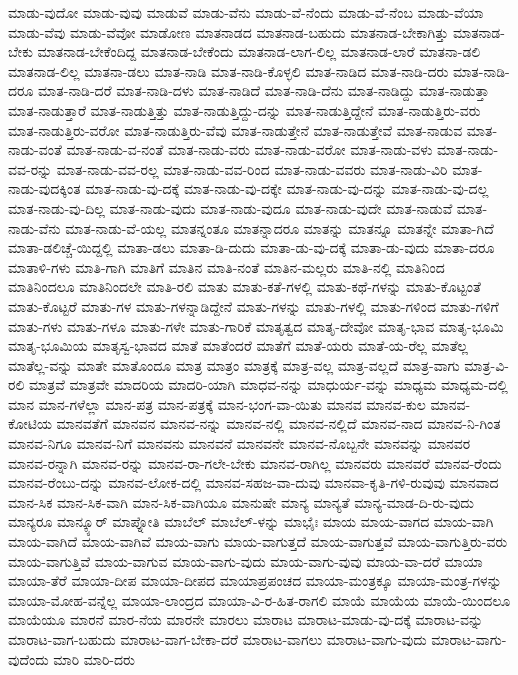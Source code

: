 {ಮಾಡು-ವುದೋ
ಮಾಡು-ವುವು
ಮಾಡುವೆ
ಮಾಡು-ವೆನು
ಮಾಡು-ವೆ-ನೆಂದು
ಮಾಡು-ವೆ-ನೆಂಬ
ಮಾಡು-ವೆಯಾ
ಮಾಡು-ವೆವು
ಮಾಡು-ವೆವೋ
ಮಾಡೋಣ
ಮಾತನಾಡದ
ಮಾತನಾಡ-ಬಹುದು
ಮಾತನಾಡ-ಬೇಕಾಗಿತ್ತು
ಮಾತನಾಡ-ಬೇಕು
ಮಾತನಾಡ-ಬೇಕೆಂದಿದ್ದ
ಮಾತನಾಡ-ಬೇಕೆಂದು
ಮಾತನಾಡ-ಲಾಗ-ಲಿಲ್ಲ
ಮಾತನಾಡ-ಲಾರೆ
ಮಾತನಾ-ಡಲಿ
ಮಾತನಾಡ-ಲಿಲ್ಲ
ಮಾತನಾ-ಡಲು
ಮಾತ-ನಾಡಿ
ಮಾತ-ನಾಡಿ-ಕೊಳ್ಳಲಿ
ಮಾತ-ನಾಡಿದ
ಮಾತ-ನಾಡಿ-ದರು
ಮಾತ-ನಾಡಿ-ದರೂ
ಮಾತ-ನಾಡಿ-ದರೆ
ಮಾತ-ನಾಡಿ-ದಳು
ಮಾತ-ನಾಡಿದೆ
ಮಾತ-ನಾಡಿ-ದೆನು
ಮಾತ-ನಾಡಿದ್ದು
ಮಾತ-ನಾಡುತ್ತಾ
ಮಾತ-ನಾಡುತ್ತಾರೆ
ಮಾತ-ನಾಡುತ್ತಿತ್ತು
ಮಾತ-ನಾಡುತ್ತಿದ್ದು-ದನ್ನು
ಮಾತ-ನಾಡುತ್ತಿದ್ದೇನೆ
ಮಾತ-ನಾಡುತ್ತಿರು-ವರು
ಮಾತ-ನಾಡುತ್ತಿರು-ವರೋ
ಮಾತ-ನಾಡುತ್ತಿರು-ವೆವು
ಮಾತ-ನಾಡುತ್ತೇನೆ
ಮಾತ-ನಾಡುತ್ತೇವೆ
ಮಾತ-ನಾಡುವ
ಮಾತ-ನಾಡು-ವಂತೆ
ಮಾತ-ನಾಡು-ವ-ನಂತೆ
ಮಾತ-ನಾಡು-ವರು
ಮಾತ-ನಾಡು-ವರೋ
ಮಾತ-ನಾಡು-ವಳು
ಮಾತ-ನಾಡು-ವವ-ರನ್ನು
ಮಾತ-ನಾಡು-ವವ-ರಲ್ಲ
ಮಾತ-ನಾಡು-ವವ-ರಿಂದ
ಮಾತ-ನಾಡು-ವವರು
ಮಾತ-ನಾಡು-ವಿರಿ
ಮಾತ-ನಾಡು-ವುದಕ್ಕಿಂತ
ಮಾತ-ನಾಡು-ವು-ದಕ್ಕೆ
ಮಾತ-ನಾಡು-ವು-ದಕ್ಕೇ
ಮಾತ-ನಾಡು-ವು-ದನ್ನು
ಮಾತ-ನಾಡು-ವು-ದಲ್ಲ
ಮಾತ-ನಾಡು-ವು-ದಿಲ್ಲ
ಮಾತ-ನಾಡು-ವುದು
ಮಾತ-ನಾಡು-ವುದೂ
ಮಾತ-ನಾಡು-ವುದೇ
ಮಾತ-ನಾಡುವೆ
ಮಾತ-ನಾಡು-ವೆನು
ಮಾತ-ನಾಡು-ವೆ-ಯಲ್ಲ
ಮಾತನ್ನಂತೂ
ಮಾತನ್ನಾದರೂ
ಮಾತನ್ನು
ಮಾತನ್ನೂ
ಮಾತನ್ನೇ
ಮಾತಾ-ಗಿದೆ
ಮಾತಾ-ಡಲಿಚ್ಚೆ-ಯಿದ್ದಲ್ಲಿ
ಮಾತಾ-ಡಲು
ಮಾತಾ-ಡಿ-ದುದು
ಮಾತಾ-ಡು-ವು-ದಕ್ಕೆ
ಮಾತಾ-ಡು-ವುದು
ಮಾತಾ-ದರೂ
ಮಾತಾಳಿ-ಗಳು
ಮಾತಿ-ಗಾಗಿ
ಮಾತಿಗೆ
ಮಾತಿನ
ಮಾತಿ-ನಂತೆ
ಮಾತಿನ-ಮಲ್ಲರು
ಮಾತಿ-ನಲ್ಲಿ
ಮಾತಿನಿಂದ
ಮಾತಿನಿಂದಲೂ
ಮಾತಿನಿಂದಲೇ
ಮಾತಿ-ರಲಿ
ಮಾತು
ಮಾತು-ಕತೆ-ಗಳಲ್ಲಿ
ಮಾತು-ಕಥೆ-ಗಳನ್ನು
ಮಾತು-ಕೊಟ್ಟಂತೆ
ಮಾತು-ಕೊಟ್ಟರೆ
ಮಾತು-ಗಳ
ಮಾತು-ಗಳನ್ನಾಡಿದ್ದೇನೆ
ಮಾತು-ಗಳನ್ನು
ಮಾತು-ಗಳಲ್ಲಿ
ಮಾತು-ಗಳಿಂದ
ಮಾತು-ಗಳಿಗೆ
ಮಾತು-ಗಳು
ಮಾತು-ಗಳೂ
ಮಾತು-ಗಳೇ
ಮಾತು-ಗಾರಿಕೆ
ಮಾತೃತ್ವದ
ಮಾತೃ-ದೇವೋ
ಮಾತೃ-ಭಾವ
ಮಾತೃ-ಭೂಮಿ
ಮಾತೃ-ಭೂಮಿಯ
ಮಾತೃಸ್ವ-ಭಾವದ
ಮಾತೆ
ಮಾತೆಂದರೆ
ಮಾತೆಗೆ
ಮಾತೆ-ಯರು
ಮಾತೆ-ಯ-ರೆಲ್ಲ
ಮಾತೆಲ್ಲ
ಮಾತೆಲ್ಲ-ವನ್ನು
ಮಾತೇ
ಮಾತೊಂದೂ
ಮಾತ್ರ
ಮಾತ್ರಂ
ಮಾತ್ರಕ್ಕೆ
ಮಾತ್ರ-ವಲ್ಲ
ಮಾತ್ರ-ವಲ್ಲದೆ
ಮಾತ್ರ-ವಾಗು
ಮಾತ್ರ-ವಿ-ರಲಿ
ಮಾತ್ರವೆ
ಮಾತ್ರವೇ
ಮಾದರಿಯ
ಮಾದರಿ-ಯಾಗಿ
ಮಾಧವ-ನನ್ನು
ಮಾಧುರ್ಯ-ವನ್ನು
ಮಾಧ್ಯಮ
ಮಾಧ್ಯಮ-ದಲ್ಲಿ
ಮಾನ
ಮಾನ-ಗಳೆಲ್ಲಾ
ಮಾನ-ಪತ್ರ
ಮಾನ-ಪತ್ರಕ್ಕೆ
ಮಾನ-ಭಂಗ-ವಾ-ಯಿತು
ಮಾನವ
ಮಾನವ-ಕುಲ
ಮಾನವ-ಕೋಟಿಯ
ಮಾನವತೆಗೆ
ಮಾನವನ
ಮಾನವ-ನನ್ನು
ಮಾನವ-ನಲ್ಲಿ
ಮಾನವ-ನಲ್ಲಿದೆ
ಮಾನವ-ನಾದ
ಮಾನವ-ನಿ-ಗಿಂತ
ಮಾನವ-ನಿಗೂ
ಮಾನವ-ನಿಗೆ
ಮಾನವನು
ಮಾನವನೆ
ಮಾನವನೇ
ಮಾನವ-ನೊಬ್ಬನೇ
ಮಾನವನ್ನು
ಮಾನವರ
ಮಾನವ-ರನ್ನಾಗಿ
ಮಾನವ-ರನ್ನು
ಮಾನವ-ರಾ-ಗಲೇ-ಬೇಕು
ಮಾನವ-ರಾಗಿಲ್ಲ
ಮಾನವರು
ಮಾನವರೆ
ಮಾನವ-ರೆಂದು
ಮಾನವ-ರೆಂಬು-ದನ್ನು
ಮಾನವ-ಲೋಕ-ದಲ್ಲಿ
ಮಾನವ-ಸಹಜ-ವಾ-ದುವು
ಮಾನವಾ-ಕೃತಿ-ಗಳಿ-ರುವುವು
ಮಾನವಾದ
ಮಾನ-ಸಿಕ
ಮಾನ-ಸಿಕ-ವಾಗಿ
ಮಾನ-ಸಿಕ-ವಾಗಿಯೂ
ಮಾನುಷೇ
ಮಾನ್ಯ
ಮಾನ್ಯತೆ
ಮಾನ್ಯ-ಮಾಡ-ದಿ-ರು-ವುದು
ಮಾನ್ಯರೂ
ಮಾನ್ಕ್ಯೂರ್
ಮಾಪ್ನೋತಿ
ಮಾಬೆಲ್
ಮಾಬೆಲ್-ಳನ್ನು
ಮಾಭೈಃ
ಮಾಯ
ಮಾಯ-ವಾಗದ
ಮಾಯ-ವಾಗಿ
ಮಾಯ-ವಾಗಿದೆ
ಮಾಯ-ವಾಗಿವೆ
ಮಾಯ-ವಾಗು
ಮಾಯ-ವಾಗುತ್ತದೆ
ಮಾಯ-ವಾಗುತ್ತವೆ
ಮಾಯ-ವಾಗುತ್ತಿರು-ವರು
ಮಾಯ-ವಾಗುತ್ತಿವೆ
ಮಾಯ-ವಾಗುವ
ಮಾಯ-ವಾಗು-ವುದು
ಮಾಯ-ವಾಗು-ವುವು
ಮಾಯ-ವಾ-ದರೆ
ಮಾಯಾ
ಮಾಯಾ-ತೆರೆ
ಮಾಯಾ-ದೀಪ
ಮಾಯಾ-ದೀಪದ
ಮಾಯಾಪ್ರಪಂಚದ
ಮಾಯಾ-ಮಂತ್ರಕ್ಕೂ
ಮಾಯಾ-ಮಂತ್ರ-ಗಳನ್ನು
ಮಾಯಾ-ಮೋಹ-ವನ್ನೆಲ್ಲ
ಮಾಯಾ-ಲಾಂದ್ರದ
ಮಾಯಾ-ವಿ-ರ-ಹಿತ-ರಾಗಲಿ
ಮಾಯೆ
ಮಾಯೆಯ
ಮಾಯೆ-ಯಿಂದಲೂ
ಮಾಯೆಯೂ
ಮಾರನೆ
ಮಾರ-ನೆಯ
ಮಾರನೇ
ಮಾರಲು
ಮಾರಾಟ
ಮಾರಾಟ-ಮಾಡು-ವು-ದಕ್ಕೆ
ಮಾರಾಟ-ವನ್ನು
ಮಾರಾಟ-ವಾಗ-ಬಹುದು
ಮಾರಾಟ-ವಾಗ-ಬೇಕಾ-ದರೆ
ಮಾರಾಟ-ವಾಗಲು
ಮಾರಾಟ-ವಾಗು-ವುದು
ಮಾರಾಟ-ವಾಗು-ವುದೆಂದು
ಮಾರಿ
ಮಾರಿ-ದರು
}
